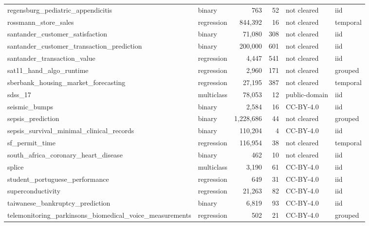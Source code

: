 \begin{longtable}{>{\raggedright\arraybackslash}p{5.5cm}lrrll}
regensburg\_\allowbreak{}pediatric\_\allowbreak{}appendicitis & binary & 763 & 52 & not cleared & iid\\
rossmann\_\allowbreak{}store\_\allowbreak{}sales & regression & 844,392 & 16 & not cleared & temporal\\
santander\_\allowbreak{}customer\_\allowbreak{}satisfaction & binary & 71,080 & 308 & not cleared & iid\\
santander\_\allowbreak{}customer\_\allowbreak{}transaction\_\allowbreak{}prediction & binary & 200,000 & 601 & not cleared & iid\\
santander\_\allowbreak{}transaction\_\allowbreak{}value & regression & 4,447 & 541 & not cleared & iid\\
sat11\_\allowbreak{}hand\_\allowbreak{}algo\_\allowbreak{}runtime & regression & 2,960 & 171 & not cleared & grouped\\
sberbank\_\allowbreak{}housing\_\allowbreak{}market\_\allowbreak{}forecasting & regression & 27,195 & 387 & not cleared & temporal\\
sdss\_\allowbreak{}17 & multiclass & 78,053 & 12 & public-domain & iid\\
seismic\_\allowbreak{}bumps & binary & 2,584 & 16 & CC-BY-4.0 & iid\\
sepsis\_\allowbreak{}prediction & binary & 1,228,686 & 44 & not cleared & grouped\\
sepsis\_\allowbreak{}survival\_\allowbreak{}minimal\_\allowbreak{}clinical\_\allowbreak{}records & binary & 110,204 & 4 & CC-BY-4.0 & iid\\
sf\_\allowbreak{}permit\_\allowbreak{}time & regression & 116,954 & 38 & not cleared & temporal\\
south\_\allowbreak{}africa\_\allowbreak{}coronary\_\allowbreak{}heart\_\allowbreak{}disease & binary & 462 & 10 & not cleared & iid\\
splice & multiclass & 3,190 & 61 & CC-BY-4.0 & iid\\
student\_\allowbreak{}portuguese\_\allowbreak{}performance & regression & 649 & 31 & CC-BY-4.0 & iid\\
superconductivity & regression & 21,263 & 82 & CC-BY-4.0 & iid\\
taiwanese\_\allowbreak{}bankruptcy\_\allowbreak{}prediction & binary & 6,819 & 93 & CC-BY-4.0 & iid\\
telemonitoring\_\allowbreak{}parkinsons\_\allowbreak{}biomedical\_\allowbreak{}voice\_\allowbreak{}measurements & regression & 502 & 21 & CC-BY-4.0 & grouped\\

\end{longtable}
